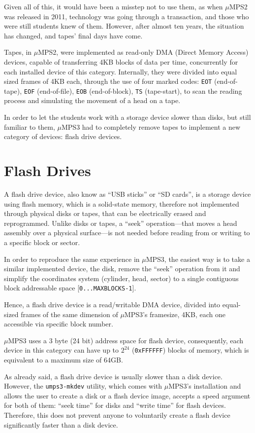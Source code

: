 \documentclass[12pt,a4paper,openright,twoside]{report}
\begin{document}
Given all of this, it would have been a misstep not to use them, as when $\mu$MPS2 was released in 2011, technology was going through a transaction, and those who were still students knew of them. However, after almost ten years, the situation has changed, and tapes' final days have come.

Tapes, in $\mu$MPS2, were implemented as read-only DMA (Direct Memory Access) devices, capable of transferring 4KB blocks of data per time, concurrently for each installed device of this category.
Internally, they were divided into equal sized frames of 4KB each, through the use of four marked codes: \texttt{EOT} (end-of-tape), \texttt{EOF} (end-of-file), \texttt{EOB} (end-of-block), \texttt{TS} (tape-start), to scan the reading process and simulating the movement of a head on a tape.

In order to let the students work with a storage device slower than disks, but still familiar to them, $\mu$MPS3 had to completely remove tapes to implement a new category of devices: flash drive devices.

\section{Flash Drives}
A flash drive device, also know as ``USB sticks'' or ``SD cards'', is a storage device using flash memory, which is a solid-state memory, therefore not implemented through physical disks or tapes, that can be electrically erased and reprogrammed.
Unlike disks or tapes, a ``seek'' operation---that moves a head assembly over a physical surface---is not needed before reading from or writing to a specific block or sector.

In order to reproduce the same experience in $\mu$MPS3, the easiest way is to take a similar implemented device, the disk, remove the ``seek'' operation from it and simplify the coordinates system (cylinder, head, sector) to a single contiguous block addressable space [\texttt{0...MAXBLOCKS-1}].

Hence, a flash drive device is a read/writable DMA device, divided into equal-sized frames of the same dimension of $\mu$MPS3's framesize, 4KB, each one accessible via specific block number.

$\mu$MPS3 uses a 3 byte (24 bit) address space for flash device, consequently, each device in this category can have up to $2^{24}$ (\texttt{0xFFFFFF}) blocks of memory, which is equivalent to a maximum size of 64GB.

As already said, a flash drive device is usually slower than a disk device.
However, the \texttt{umps3-mkdev} utility, which comes with $\mu$MPS3's installation and allows the user to create a disk or a flash device image, accepts a speed argument for both of them: ``seek time'' for disks and ``write time'' for flash devices. Therefore, this does not prevent anyone to voluntarily create a flash device significantly faster than a disk device.
\end{document}
